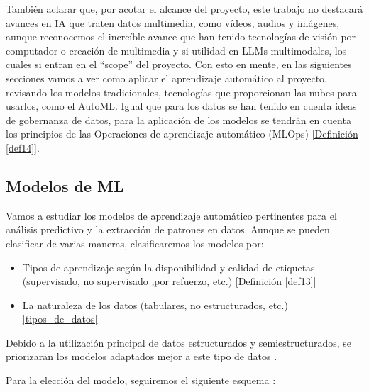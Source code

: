 También aclarar que, por acotar el alcance del proyecto, este trabajo no destacará avances en IA que traten datos multimedia, como vídeos, audios y imágenes, aunque reconocemos el increíble avance que han tenido tecnologías de visión por computador o creación de multimedia y si utilidad en LLMs multimodales, los cuales si entran en el ``scope'' del proyecto. Con esto en mente, en las siguientes secciones vamos a ver como aplicar el aprendizaje automático al proyecto, revisando los modelos tradicionales, tecnologías que proporcionan las nubes para usarlos, como el AutoML. Igual que para los datos se han tenido en cuenta ideas de gobernanza de datos, para la aplicación de los modelos se tendrán en cuenta los principios de las Operaciones de aprendizaje automático (MLOps) \hyperref[def14]{[Definición \ref*{def14}]}.

\subsection{Modelos de ML}

Vamos a estudiar los modelos de aprendizaje automático pertinentes para el análisis predictivo y la extracción de patrones en datos. Aunque se pueden clasificar de varias maneras, clasificaremos los modelos por:
\begin{itemize}
	\item Tipos de aprendizaje según la disponibilidad y calidad de etiquetas (supervisado, no supervisado ,por refuerzo, etc.) \hyperref[def13]{[Definición \ref*{def13}]}
	\item La naturaleza de los datos (tabulares, no estructurados, etc.) \ref{tipos_de_datos}
\end{itemize}
Debido a la utilización principal de datos estructurados y semiestructurados, se priorizaran los modelos adaptados mejor a este tipo de datos \citep{Fowdur2021}.

Para la elección del modelo, seguiremos el siguiente esquema \citep{Jason2024MLTypes}:

